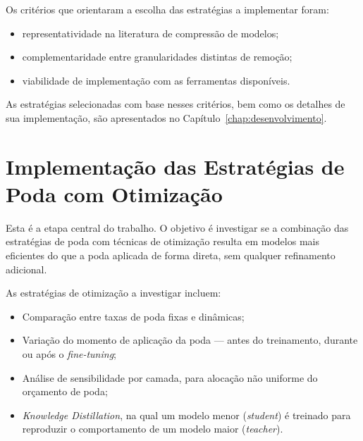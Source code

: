 
Os critérios que orientaram a escolha das estratégias a implementar foram:

\begin{itemize}
    \item representatividade na literatura de compressão de modelos;
    \item complementaridade entre granularidades distintas de remoção;
    \item viabilidade de implementação com as ferramentas disponíveis.
\end{itemize}





As estratégias selecionadas com base nesses critérios, bem como os detalhes de sua
implementação, são apresentados no Capítulo~\ref{chap:desenvolvimento}.

\section{Implementação das Estratégias de Poda com Otimização}\label{sec:metodologia_poda_com}

Esta é a etapa central do trabalho. O objetivo é investigar se a combinação das estratégias de
poda com técnicas de otimização resulta em modelos mais eficientes do que a poda aplicada de
forma direta, sem qualquer refinamento adicional.

As estratégias de otimização a investigar incluem:

\begin{itemize}
    \item Comparação entre taxas de poda fixas e dinâmicas;
    \item Variação do momento de aplicação da poda --- antes do treinamento, durante ou após
          o \textit{fine-tuning};
    \item Análise de sensibilidade por camada, para alocação não uniforme do orçamento de poda;
    \item \textit{Knowledge Distillation}, na qual um modelo menor (\textit{student}) é treinado
          para reproduzir o comportamento de um modelo maior (\textit{teacher}).
\end{itemize}


